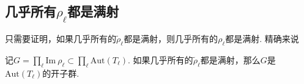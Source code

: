 \subsection{几乎所有\texorpdfstring{$\rho_{\ell}$}{rho ell}都是满射}

只需要证明，如果几乎所有的$\tilde{\rho}_{\ell}$都是满射，则几乎所有的$\rho_{\ell}$都是满射.
精确来说
\begin{cprop}
    记$G = \prod_{\ell} \mathrm{Im}\ \rho_{\ell} \subset \prod_{\ell} \mathrm{Aut}(T_{\ell})$.
    如果几乎所有的$\tilde{\rho}_{\ell}$都是满射，那么$G$是$\mathrm{Aut}(T_{\ell})$的开子群.
\end{cprop}



